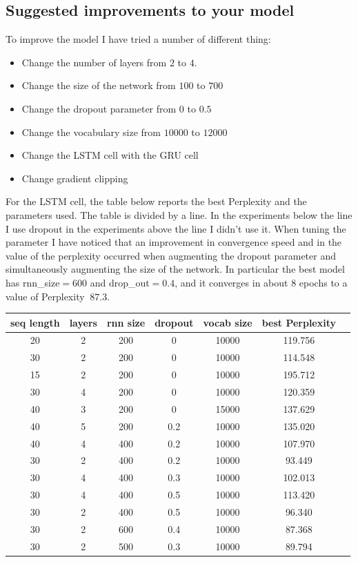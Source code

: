 \documentclass{article}
\begin{document}
\begin{enumerate}
\subsection{Suggested improvements to your model}
To improve the model I have tried a number of different thing:
\begin{itemize}
\item Change the number of layers from $2$ to $4$.
\item Change the size of the network from $100$ to $700$
\item Change the dropout parameter from $0$ to $0.5$
\item Change the vocabulary size from $10000$ to $12000$ 
\item Change the LSTM cell with the GRU cell
\item Change gradient clipping
\end{itemize}
 For the LSTM cell, the table below reports the best Perplexity and the parameters used.  The table is divided by a line. In the experiments below the line I use dropout  in the experiments above the line I didn't use it.
 When tuning the parameter I have noticed that an improvement in convergence speed and in the value of the perplexity occurred when augmenting the dropout parameter and simultaneously augmenting the size of the network. In particular the best model \cite{bestModel} has  rnn\_size$=600$ and  drop\_out$=0.4$, and it converges in about $8$ epochs to a value of Perplexity $~87.3$.
  

\begin{center}
\begin{tabular}{ |c|c|c|c|c|c|c|} 
\hline
seq length & layers & rnn size & dropout  & vocab size & best Perplexity\\
\hline
 20 & 2 & 200 & 0 &  10000 & 119.756\\ 
 30 & 2 & 200 & 0 &  10000 & 114.548\\ 
 15 & 2 & 200 & 0 &  10000 & 195.712\\ 
  30 & 4 & 200 & 0 & 10000 & 120.359\\
  40 & 3 & 200 & 0 & 15000 & 137.629\\
  \hline
 40 & 5 & 200 & 0.2 & 10000 & 135.020\\
 40 & 4 & 400 & 0.2 & 10000 & 107.970\\
 30 & 2 & 400 & 0.2 & 10000 & 93.449\\
 30 & 4 & 400 & 0.3 & 10000 & 102.013\\
  30 & 4 & 400 & 0.5 & 10000 & 113.420\\
  30 & 2 & 400 & 0.5 &  10000 & 96.340\\
  30 & 2 & 600 & 0.4 &  10000 & 87.368\\  
  30 & 2 & 500 & 0.3 &  10000 & 89.794\\  
\hline
\end{tabular}
\end{center}


\end{enumerate}
\end{document}
